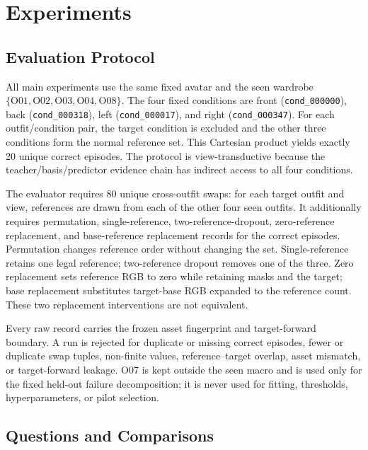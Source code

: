 \section{Experiments}

\subsection{Evaluation Protocol}

All main experiments use the same fixed avatar and the seen wardrobe $\{\mathrm{O01},\mathrm{O02},\mathrm{O03},\mathrm{O04},\mathrm{O08}\}$. The four fixed conditions are front (\texttt{cond\_000000}), back (\texttt{cond\_000318}), left (\texttt{cond\_000017}), and right (\texttt{cond\_000347}). For each outfit/condition pair, the target condition is excluded and the other three conditions form the normal reference set. This Cartesian product yields exactly 20 unique correct episodes. The protocol is view-transductive because the teacher/basis/predictor evidence chain has indirect access to all four conditions.

The evaluator requires 80 unique cross-outfit swaps: for each target outfit and view, references are drawn from each of the other four seen outfits. It additionally requires permutation, single-reference, two-reference-dropout, zero-reference replacement, and base-reference replacement records for the correct episodes. Permutation changes reference order without changing the set. Single-reference retains one legal reference; two-reference dropout removes one of the three. Zero replacement sets reference RGB to zero while retaining masks and the target; base replacement substitutes target-base RGB expanded to the reference count. These two replacement interventions are not equivalent.

Every raw record carries the frozen asset fingerprint and target-forward boundary. A run is rejected for duplicate or missing correct episodes, fewer or duplicate swap tuples, non-finite values, reference--target overlap, asset mismatch, or target-forward leakage. O07 is kept outside the seen macro and is used only for the fixed held-out failure decomposition; it is never used for fitting, thresholds, hyperparameters, or pilot selection.

\subsection{Questions and Comparisons}

